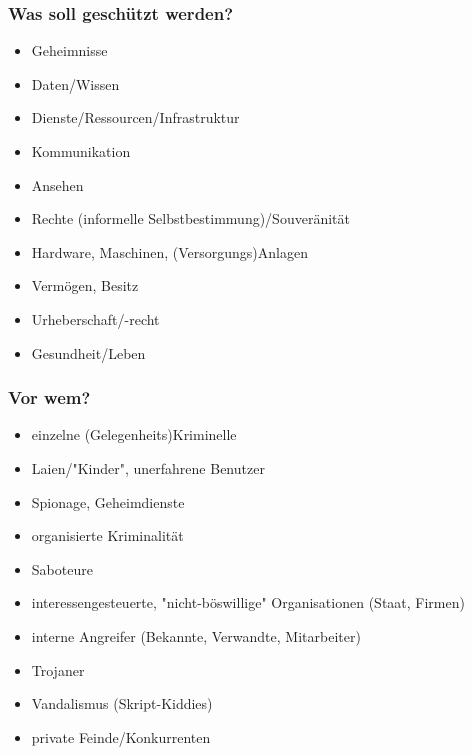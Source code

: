 \documentclass[a4paper,twoside,DIV15,BCOR12mm]{scrbook}
\begin{document}
\subsubsection{Was soll geschützt werden?}
	\begin{itemize}
		\item Geheimnisse
		\item Daten/Wissen
		\item Dienste/Ressourcen/Infrastruktur
		\item Kommunikation
		\item Ansehen
		\item Rechte (informelle Selbstbestimmung)/Souveränität
		\item Hardware, Maschinen, (Versorgungs)Anlagen
		\item Vermögen, Besitz
		\item Urheberschaft/-recht
		\item Gesundheit/Leben
	\end{itemize}
	
\subsubsection{Vor wem?}
	\begin{itemize}
		\item einzelne (Gelegenheits)Kriminelle
		\item Laien/"Kinder", unerfahrene Benutzer
		\item Spionage, Geheimdienste
		\item organisierte Kriminalität
		\item Saboteure
		\item interessengesteuerte, "nicht-böswillige" Organisationen (Staat, Firmen)
		\item interne Angreifer (Bekannte, Verwandte, Mitarbeiter)
		\item Trojaner
		\item Vandalismus (Skript-Kiddies)
		\item private Feinde/Konkurrenten
	\end{itemize}
	
\end{document}
